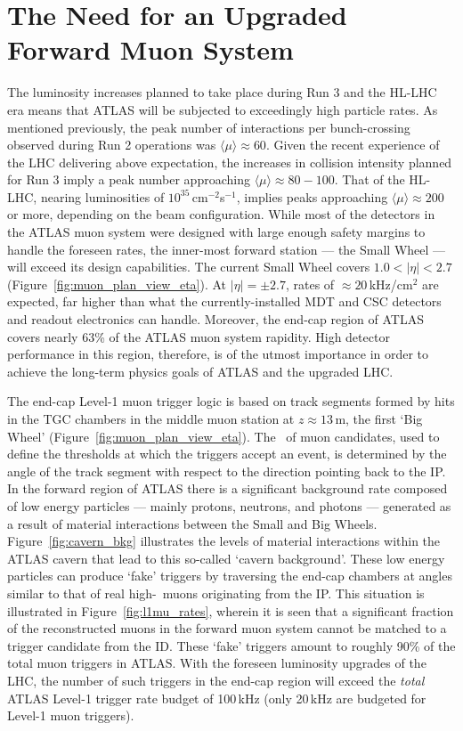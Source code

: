 \section{The Need for an Upgraded Forward Muon System}
\label{sec:nsw_motivation}

The luminosity increases planned to take place during Run 3 and the HL-LHC
era means that ATLAS will be subjected to exceedingly high particle rates.
As mentioned previously, the peak number of interactions per bunch-crossing observed during
Run 2 operations was $\langle \mu \rangle \approx 60$.
Given the recent experience of the LHC delivering above expectation,
the increases in collision intensity planned for Run 3 imply a peak number approaching
$\langle \mu \rangle \approx 80-100$. 
That of the HL-LHC, nearing luminosities of $10^{35}$\,cm$^{-2}$s$^{-1}$, implies peaks approaching $\langle \mu \rangle \approx 200$ or more, depending
on the beam configuration.
While most of the detectors in the ATLAS muon system were designed with large enough safety margins
to handle the foreseen rates, the inner-most forward station --- the Small Wheel --- will
exceed its design capabilities.
The current Small Wheel covers $1.0 < \lvert \eta \rvert < 2.7$ (Figure~\ref{fig:muon_plan_view_eta}).
At $\lvert \eta \rvert = \pm 2.7$, rates of $\approx 20$\,kHz/cm$^2$ are expected, far higher
than what the currently-installed MDT and CSC detectors and readout electronics can handle.
Moreover, the end-cap region of ATLAS covers nearly 63\% of the ATLAS muon system rapidity.
High detector performance in this region, therefore, is of the utmost importance in order to
achieve the long-term physics goals of ATLAS and the upgraded LHC.

The end-cap Level-1 muon trigger logic is based on track segments formed by hits in the TGC chambers
in the middle muon station at $z\approx 13$\,m, the first `Big Wheel' (Figure~\ref{fig:muon_plan_view_eta}).
The \pT~of muon candidates, used to define the thresholds at which the triggers accept an event, is
determined by the angle of the track segment with respect to the direction pointing back to the IP.
In the forward region of ATLAS there is a significant background rate composed of low energy particles ---
mainly protons, neutrons, and photons --- generated as a result of material interactions between
the Small and Big Wheels.
Figure~\ref{fig:cavern_bkg} illustrates the levels of material interactions within the ATLAS
cavern that lead to this so-called `cavern background'.
These low energy particles can produce `fake' triggers by traversing the end-cap chambers
at angles similar to that of real high-\pT~muons originating from the IP.
This situation is illustrated in Figure~\ref{fig:l1mu_rates}, wherein it is seen that
a significant fraction of the reconstructed muons in the forward muon system cannot be matched
to a trigger candidate from the ID.
These `fake' triggers amount to roughly 90\% of the total muon triggers in ATLAS.
With the foreseen luminosity upgrades of the LHC, the number of such triggers in the end-cap region
will exceed the \textit{total} ATLAS Level-1 trigger rate budget of 100\,kHz (only 20\,kHz are budgeted
for Level-1 muon triggers).

